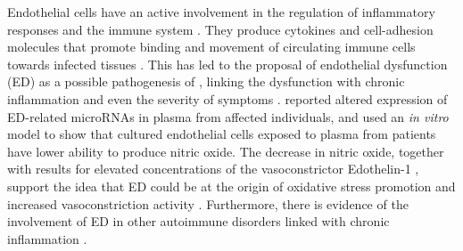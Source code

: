 Endothelial cells have an active involvement in the regulation of inflammatory responses and the immune system \citep{pober2007EvolvingFunctions}.
They produce cytokines and cell-adhesion molecules that promote binding and movement of circulating immune cells towards infected tissues \citep{janeway2017Immunology}.
This has led to the proposal of endothelial dysfunction (ED) as a possible pathogenesis of \cfs, linking the dysfunction with chronic inflammation and even the severity of symptoms \citep{scherbakov2020PeripheralEndothelial}.
\citet{blauensteiner2021AlteredEndothelial} reported altered expression of ED-related microRNAs in plasma from affected individuals, and \citet{bertinat2022DecreasedNO} used an \textit{in vitro} model to show that cultured endothelial cells exposed to plasma from \cfs patients have lower ability to produce nitric oxide.
The decrease in nitric oxide, together with results for elevated concentrations of the vasoconstrictor Edothelin-1 \citep{haffke2022EndothelialDysfunction}, support the idea that ED could be at the origin of oxidative stress promotion and increased vasoconstriction activity \citep{kostov2021CausalRelationship}.
Furthermore, there is evidence of the involvement of ED in other autoimmune disorders linked with chronic inflammation \citep{steyers2014EndothelialDysfunction}.


